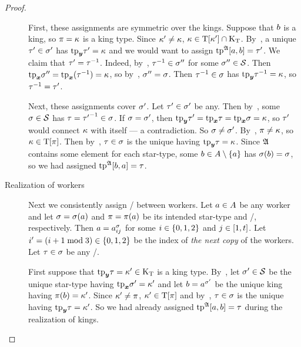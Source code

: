 \begin{proof}
\begin{description}
  First, these assignments are symmetric over the kings.
  Suppose that $b$ is a king, so $\pi = \kappa$ is a king type.
  Since ${\kappa'} \neq \kappa$, $\kappa \in \mathrm{T}[{\kappa'}] \cap {\mathrm{K}}_{\mathrm{T}}$.
  By~, a unique ${\tau'}\in{\sigma'}$ has $\mathrm{tp}_{\bm{y}}{\tau'} = \kappa$ and we
  would want to assign $\operatorname{tp}^{\mathfrak{A}}[a,b] = {\tau'}$.
  We claim that ${\tau'} = \tau^{-1}$.
  Indeed, by~, $\tau^{-1} \in {\sigma''}$ for some ${\sigma''}\in\mathcal{S}$.
  Then $\mathrm{tp}_{\bm{x}}{\sigma''} = \mathrm{tp}_{\bm{x}}(\tau^{-1}) = \kappa$, so by~, ${\sigma''} =
  \sigma$.
  Then $\tau^{-1} \in \sigma$ has $\mathrm{tp}_{\bm{y}}\tau^{-1} = \kappa$, so $\tau^{-1} = {\tau'}$.
  
  Next, these assignments cover ${\sigma'}$.
  Let ${\tau'}\in{\sigma'}$ be any.
  Then by~, some $\sigma\in\mathcal{S}$ has $\tau = {\tau'}^{-1}\in\sigma$.
  If $\sigma = {\sigma'}$, then $\mathrm{tp}_{\bm{y}}{\tau'} = \mathrm{tp}_{\bm{x}}\tau = \mathrm{tp}_{\bm{x}}\sigma = \kappa$,
  so ${\tau'}$ would connect $\kappa$ with itself --- a contradiction.
  So $\sigma \neq {\sigma'}$.
  By~, $\pi \neq \kappa$, so $\kappa \in \mathrm{T}[\pi]$.
  Then by~, $\tau\in\sigma$ is the unique having $\mathrm{tp}_{\bm{y}}\tau = \kappa$.
  Since $\mathfrak{A}$ contains some element for each star-type,
  some $b\in A\setminus\left\{a\right\}$ has $\sigma(b) = \sigma$, so we had assigned
  $\operatorname{tp}^{\mathfrak{A}}[b,a] = \tau$.
  
  \item[Realization of workers]
  Next we consistently assign \twotypes/ between workers.
  Let $a\in A$ be any worker and let $\sigma=\sigma(a)$ and
  $\pi=\pi(a)$ be its intended star-type and \onetype/, respectively.
  Then $a = a^{\sigma}_{i j}$ for some $i\in\left\{0,1,2\right\}$ and
  $j\in[1,t]$.
  Let ${i'}=(i+1\bmod3)\in\left\{0,1,2\right\}$ be the index of \emph{the next copy} of
  the workers.
  Let $\tau\in\sigma$ be any \twotype/.
  
  First suppose that $\mathrm{tp}_{\bm{y}}\tau = {\kappa'} \in {\mathrm{K}}_{\mathrm{T}}$ is a king type.
  By~, let ${\sigma'}\in\mathcal{S}$ be the unique star-type having
  $\mathrm{tp}_{\bm{x}}{\sigma'} = {\kappa'}$ and let $b = a^{{\sigma'}}$ be the unique king having
  $\pi(b) = {\kappa'}$.
  Since ${\kappa'}\neq\pi$, ${\kappa'} \in \mathrm{T}[\pi]$ and by~,
  $\tau\in\sigma$ is the unique having $\mathrm{tp}_{\bm{y}}\tau = {\kappa'}$.
  So we had already assigned $\operatorname{tp}^{\mathfrak{A}}[a,b] = \tau$ during the realization
  of kings.
  

\end{description}
\end{proof}
